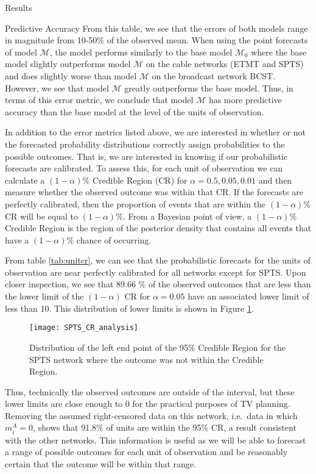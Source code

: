 \begin{chapter}{Results}
\begin{section}{Predictive Accuracy}
    From this table, we see that the errors of both models range in magnitude from 10-50\%
    of the observed mean. When using the point forecasts of model $\mathcal{M}$, the
    model performs similarly to the base model $\mathcal{M}_0$ where the base model slightly outperforms
    model $\mathcal{M}$ on the cable networks (ETMT and SPTS) and does slightly worse than model $\mathcal{M}$
    on the broadcast network BCST. However, we see that model $\mathcal{M}$ greatly outperforms the base model.
    Thus, in terms of this error metric, we conclude that model $\mathcal{M}$ has more predictive accuracy
    than the base model at the level of the units of observation.

    In addition to the error metrics listed above, we are interested in whether or not the forecasted
    probability distributions correctly assign probabilities to the possible outcomes. That is, we
    are interested in knowing if our probabilistic forecasts are calibrated. To assess this,
    for each unit of observation we can calculate a $(1 - \alpha)\%$ Credible Region (CR) for $\alpha = 0.5, 0.05, 0.01$
    and then measure whether the observed outcome was within that CR. If the forecasts are perfectly calibrated, then the proportion
    of events that are within the $(1 - \alpha)\%$ CR will be equal to $(1 - \alpha)\%$.
    From a Bayesian point of view, a $(1- \alpha)\%$ Credible Region is the region of the posterior density
    that contains all events that have a $(1- \alpha)\%$ chance of occurring.

    From table \ref{tab:unitcr}, we can see that the probabilistic forecasts for the units of observation
    are near perfectly calibrated for all networks except for SPTS. Upon closer inspection,
    we see that 89.66 \% of the observed outcomes that are less than the lower limit of the $(1 - \alpha)$ CR for $\alpha = 0.05$
    have an associated lower limit of less than 10. This distribution of lower limits is shown in
    Figure \ref{fig:cranalysis}.
    \begin{figure}[!h]
      \centering
      \texttt{[image: SPTS\_CR\_analysis]}
      \caption{Distribution of the left end point of the 95\% Credible Region for the SPTS network where the outcome was not within the Credible Region.}
      \label{fig:cranalysis}
    \end{figure}
    Thus, technically the observed outcomes are outside of the interval,
    but these lower limits are close enough to 0 for the practical purposes of TV planning.
    Removing the assumed right-censored data on this network, i.e.\ data in which $m_i^A = 0$,
    shows that 91.8\% of units are within the 95\% CR, a result consistent with the other networks.
    This information is useful as we will be able to forecast a range of possible outcomes for each
    unit of observation and be reasonably certain that the outcome will be within that range.


\end{section}
\end{chapter}
